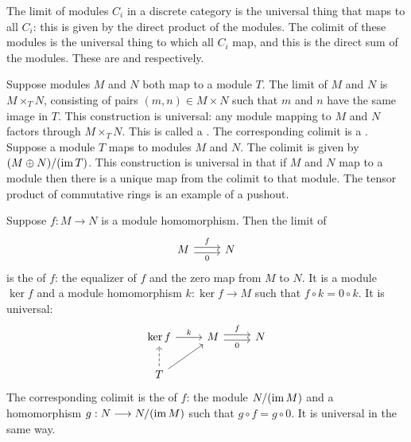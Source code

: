 \documentclass[11pt, oneside,margin=1in]{article}
\begin{document}
The limit of modules $C_i$ in a discrete category is the universal thing that maps to all $C_i$: this is given by the direct product of the modules. The colimit of these modules is the universal thing to which all $C_i$ map, and this is the direct sum of the modules. These are  and  respectively.

Suppose modules $M$ and $N$ both map to a module $T$. The limit of $M$ and $N$ is $M\times_T N$, consisting of pairs $(m,n) \in M\times N$ such that $m$ and $n$ have the same image in $T$. This construction is universal: any module mapping to $M$ and $N$ factors through $M\times_T N$. This is called a . The corresponding colimit is a . Suppose a module $T$ maps to modules $M$ and $N$. The colimit is given by $(M\oplus N) /(\operatorname{im} T)$. This construction is universal in that if $M$ and $N$ map to a module then there is a unique map from the colimit to that module. The tensor product of commutative rings is an example of a pushout. 

Suppose $f: M\longrightarrow N$ is a module homomorphism. Then the limit of
\[
\begin{tikzcd}
	M \arrow[r, shift left, "f"]\arrow[r, shift right, swap, "0"]& N
\end{tikzcd}
\]
is the  of $f$: the equalizer of $f$ and the zero map from $M$ to $N$. It is a module $\ker f$ and a module homomorphism $k: \ker f \longrightarrow M$ such that $f\circ k = 0 \circ k$. It is universal:
\[
\begin{tikzcd}
	\ker f \arrow[r, "k"] &  M \arrow[r, shift left, "f"]\arrow[r, shift right, swap, "0"]& N\\
	T \arrow[u, dashed] \arrow[ur] 
\end{tikzcd}
\]
The corresponding colimit is the  of $f$: the module $N/(\operatorname{im} M)$ and a homomorphism $g: N \longrightarrow N/(\operatorname{im} M)$ such that $g\circ f = g\circ 0$. It is universal in the same way.
\end{document}
